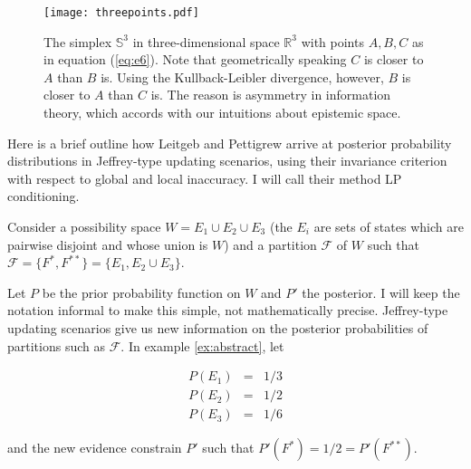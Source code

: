 \documentclass[11pt]{article}
\begin{document}
\begin{figure}[ht]
  \begin{flushright}
    \begin{minipage}[h]{.7\linewidth}
      \texttt{[image: threepoints.pdf]}
      \caption{\footnotesize The simplex $\mathbb{S}^{3}$ in
        three-dimensional space $\mathbb{R}^{3}$ with points $A,B,C$
        as in equation (\ref{eq:e6}). Note that geometrically speaking
        $C$ is closer to $A$ than $B$ is. Using the Kullback-Leibler
        divergence, however, $B$ is closer to $A$ than $C$ is. The
        reason is asymmetry in information theory, which accords with
        our intuitions about epistemic space.}
      \label{fig:threepoints}
    \end{minipage}
  \end{flushright}
\end{figure}

Here is a brief outline how Leitgeb and Pettigrew arrive at posterior
probability distributions in Jeffrey-type updating scenarios, using
their invariance criterion with respect to global and local
inaccuracy. I will call their method LP conditioning.

\begin{quotex}
  \label{ex:abstract} Consider a possibility
  space $W=E_{1}\cup{}E_{2}\cup{}E_{3}$ (the $E_{i}$ are sets of
  states which are pairwise disjoint and whose union is $W$) and a
  partition $\mathcal{F}$ of $W$ such that
  $\mathcal{F}=\{F^{*},F^{**}\}=\{E_{1},E_{2}\cup{}E_{3}\}$.
\end{quotex}

Let $P$ be the prior probability function on $W$ and $P'$ the
posterior. I will keep the notation informal to make this simple, not
mathematically precise. Jeffrey-type updating scenarios give us new
information on the posterior probabilities of partitions such as
$\mathcal{F}$. In example \ref{ex:abstract}, let

\begin{equation}
  \label{eq:priors}
  \begin{array}{rcl}
    P(E_{1})&=&1/3 \\
    P(E_{2})&=&1/2 \\
    P(E_{3})&=&1/6
  \end{array}
\end{equation}

and the new evidence constrain $P'$ such that
$P'(F^{*})=1/2=P'(F^{**})$.
\end{document}
